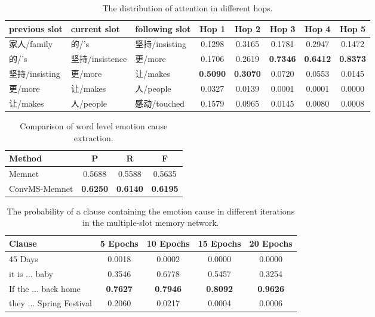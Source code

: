 \documentclass[11pt,letterpaper]{article}
\begin{document}
\begin{CJK*}{UTF8}{gbsn}
\begin{table*}[!htbp]
\centering
\small
\begin{tabular}{|l|l|l|c|c|c|c|c|}
\hline
{previous slot} & {\bf current slot} & {following slot} & {\bf Hop 1} & {\bf Hop 2} & {\bf Hop 3} & {\bf Hop 4}  & {\bf Hop 5}\\     \hline
家人/family & 的/'s & 坚持/insisting & \cellcolor{pink}0.1298&	\cellcolor{pink}0.3165&	\cellcolor{pink}0.1781 &\cellcolor{pink}0.2947 &\cellcolor{pink}0.1472\\
的/'s & 坚持/insistence & 更/more  & \cellcolor{pink}0.1706	&\cellcolor{pink}0.2619	&\cellcolor{red}\bf0.7346 &\cellcolor{red}\bf0.6412 &\cellcolor{red}\bf0.8373\\
坚持/insisting &更/more &让/makes  &  \cellcolor{red}\bf0.5090	&\cellcolor{pink}\bf0.3070	&0.0720 &0.0553 &0.0145\\
更/more & 让/makes & 人/people & 0.0327 &	0.0139	&0.0001 &0.0001 &0.0000\\ 
让/makes & 人/people & 感动/touched & \cellcolor{pink}0.1579	&0.0965&	0.0145  &0.0080 &0.0008\\  \hline
\end{tabular} 
\caption{The distribution of attention in different hops.}
\end{table*}


\begin{table}
\centering
\small
\begin{tabular}{|l|c|c|c|}
\hline
{\bf Method} & {\bf P} & {\bf R} & {\bf F}\\\hline
Memnet & 0.5688 &	0.5588	& 0.5635\\
ConvMS-Memnet  & \bf 0.6250 &	\bf0.6140	&\bf0.6195\\ \hline
\end{tabular} 
\caption{Comparison of word level emotion cause extraction.}
\end{table}


\begin{table*}[!htbp]
\centering
\small
\begin{tabular}{|l|c|c|c|c|}
\hline
{\bf Clause} & {\bf 5 Epochs} & {\bf 10 Epochs} & {\bf 15 Epochs} & {\bf 20 Epochs}\\     \hline
45 Days & 0.0018&	0.0002&	0.0000 &0.0000\\
it is ... baby  & 0.3546	&0.6778	&0.5457 &0.3254\\
If the ... back home & \bf 0.7627 &	\bf0.7946	&\bf0.8092 &\bf0.9626\\ 
they ... Spring Festival & 0.2060	&0.0217&	0.0004  &0.0006\\  \hline
\end{tabular} 
\caption{The probability of a clause containing the emotion cause in different iterations in the multiple-slot memory network.}
\end{table*}


\end{CJK*}
\end{document}
